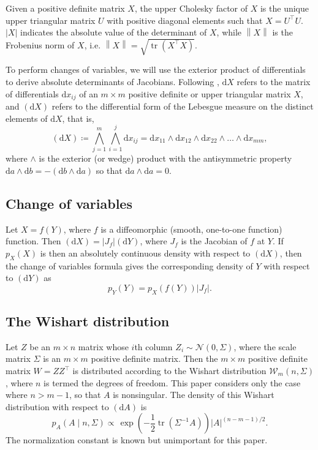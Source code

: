 \documentclass[12pt,a4paper,reqno]{amsart}
\numberwithin{equation}{section}
\newcommand{\wishart}[1]{\mathcal{W}_{#1}}
\renewcommand{\det}[1]{\left| {#1} \right|}
\newcommand{\dmeasure}[1]{\left(\dd{#1}\right)}
\newcommand{\norm}[1]{\left\lVert {#1} \right\rVert}
\newcommand{\dd}[1]{\mathrm{d}{#1}}
\newcommand{\tr}{\operatorname{tr}}
\begin{document}
Given a positive definite matrix $X$, the upper Cholesky factor of $X$ is the unique upper triangular matrix $U$ with positive diagonal elements such that $X = U^\top U$.
$\det{X}$ indicates the absolute value of the determinant of $X$, while $\norm{X}$ is the Frobenius norm of $X$, i.e. $\norm{X} = \sqrt{\tr(X^\top X)}$.

To perform changes of variables, we will use the exterior product of differentials to derive absolute determinants of Jacobians.
Following \cite{muirhead_aspects_1982}, $\dd{X}$ refers to the matrix of differentials $\dd{x}_{ij}$ of an $m \times m$ positive definite or upper triangular matrix $X$, and $\dmeasure{X}$ refers to the differential form of the Lebesgue measure on the distinct elements of $\dd{X}$, that is,
\[
    \dmeasure{X} \coloneqq \bigwedge_{j=1}^m \bigwedge_{i=1}^j \dd{x}_{ij} = \dd{x}_{11} \wedge \dd{x}_{12} \wedge \dd{x}_{22} \wedge \ldots \wedge \dd{x}_{mm},
\]
where $\wedge$ is the exterior (or wedge) product with the antisymmetric property $\dd{a} \wedge \dd{b} = -(\dd{b} \wedge \dd{a})$ so that $\dd{a} \wedge \dd{a} = 0$.

\subsection*{Change of variables}

Let $X = f(Y)$, where $f$ is a diffeomorphic (smooth, one-to-one function) function.
Then $\dmeasure{X} = \det{J_f} \dmeasure{Y}$, where $J_f$ is the Jacobian of $f$ at $Y$.
If $p_X(X)$ is then an absolutely continuous density with respect to $\dmeasure{X}$, then the change of variables formula gives the corresponding density of $Y$ with respect to $\dmeasure{Y}$ as
\[
    p_Y(Y) = p_X(f(Y)) \det{J_f}.
\]

\subsection*{The Wishart distribution}

Let $Z$ be an $m \times n$ matrix whose $i$th column $Z_i \sim \mathcal{N}(0, \Sigma)$, where the scale matrix $\Sigma$ is an $m \times m$ positive definite matrix.
Then the $m \times m$ positive definite matrix $W = Z Z^\top$ is distributed according to the Wishart distribution $\wishart{m}(n, \Sigma)$, where $n$ is termed the degrees of freedom.
This paper considers only the case where $n > m-1$, so that $A$ is nonsingular.
The density of this Wishart distribution with respect to $\dmeasure{A}$ is \parencite[Theorem 3.2.1]{muirhead_aspects_1982}
\begin{equation}\label{wishartdensity}
    p_A(A \mid n, \Sigma) \propto \frac{}{} \exp\left(-\frac{1}{2}\tr(\Sigma^{-1} A)\right) \det{A}^{(n-m-1)/2}.
\end{equation}
The normalization constant is known but unimportant for this paper.
\end{document}
